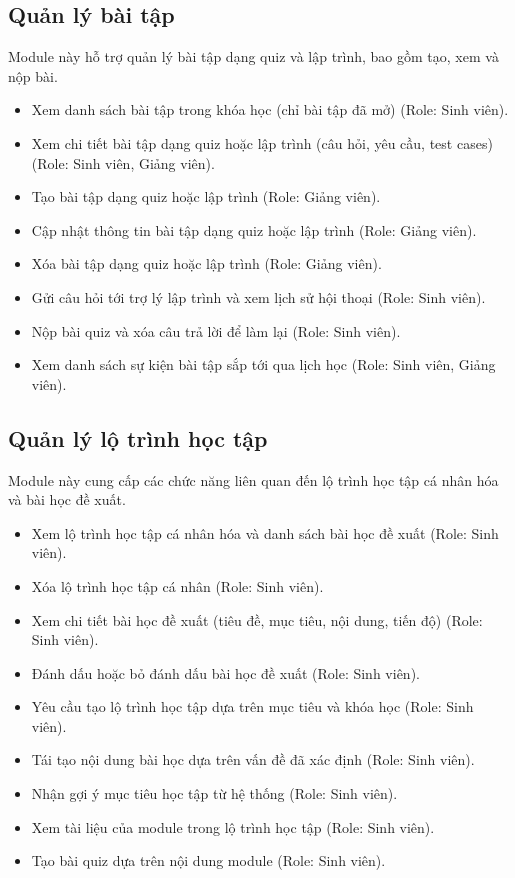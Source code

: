 \subsection{Quản lý bài tập}
Module này hỗ trợ quản lý bài tập dạng quiz và lập trình, bao gồm tạo, xem và nộp bài.
\begin{itemize}[label=--]
    \item Xem danh sách bài tập trong khóa học (chỉ bài tập đã mở) (Role: Sinh viên).
    \item Xem chi tiết bài tập dạng quiz hoặc lập trình (câu hỏi, yêu cầu, test cases) (Role: Sinh viên, Giảng viên).
    \item Tạo bài tập dạng quiz hoặc lập trình (Role: Giảng viên).
    \item Cập nhật thông tin bài tập dạng quiz hoặc lập trình (Role: Giảng viên).
    \item Xóa bài tập dạng quiz hoặc lập trình (Role: Giảng viên).
    \item Gửi câu hỏi tới trợ lý lập trình và xem lịch sử hội thoại (Role: Sinh viên).
    \item Nộp bài quiz và xóa câu trả lời để làm lại (Role: Sinh viên).
    \item Xem danh sách sự kiện bài tập sắp tới qua lịch học (Role: Sinh viên, Giảng viên).
\end{itemize}

\subsection{Quản lý lộ trình học tập}
Module này cung cấp các chức năng liên quan đến lộ trình học tập cá nhân hóa và bài học đề xuất.
\begin{itemize}[label=--]
    \item Xem lộ trình học tập cá nhân hóa và danh sách bài học đề xuất (Role: Sinh viên).
    \item Xóa lộ trình học tập cá nhân (Role: Sinh viên).
    \item Xem chi tiết bài học đề xuất (tiêu đề, mục tiêu, nội dung, tiến độ) (Role: Sinh viên).
    \item Đánh dấu hoặc bỏ đánh dấu bài học đề xuất (Role: Sinh viên).
    \item Yêu cầu tạo lộ trình học tập dựa trên mục tiêu và khóa học (Role: Sinh viên).
    \item Tái tạo nội dung bài học dựa trên vấn đề đã xác định (Role: Sinh viên).
    \item Nhận gợi ý mục tiêu học tập từ hệ thống (Role: Sinh viên).
    \item Xem tài liệu của module trong lộ trình học tập (Role: Sinh viên).
    \item Tạo bài quiz dựa trên nội dung module (Role: Sinh viên).
\end{itemize}


